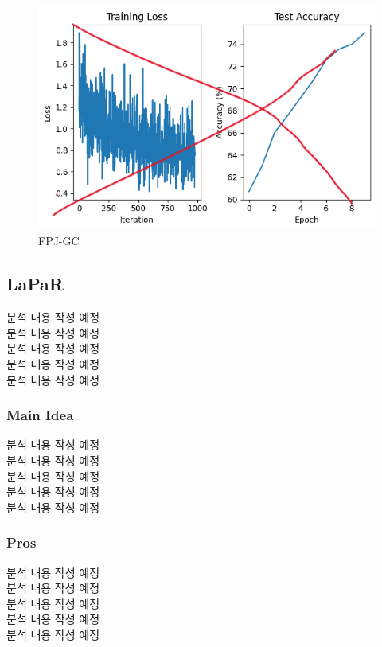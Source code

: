 \begin{figure}[h]
  \centering
  \includegraphics[width=\linewidth]{images/temp.png}
  \caption{FPJ-GC}
  \label{fig:FPJ-GC1}
\end{figure}

\subsection{LaPaR}
분석 내용 작성 예정\\
분석 내용 작성 예정\\
분석 내용 작성 예정\\
분석 내용 작성 예정\\
분석 내용 작성 예정\\

\subsubsection{Main Idea}
분석 내용 작성 예정\\
분석 내용 작성 예정\\
분석 내용 작성 예정\\
분석 내용 작성 예정\\
분석 내용 작성 예정\\

\subsubsection{Pros}
분석 내용 작성 예정\\
분석 내용 작성 예정\\
분석 내용 작성 예정\\
분석 내용 작성 예정\\
분석 내용 작성 예정\\

